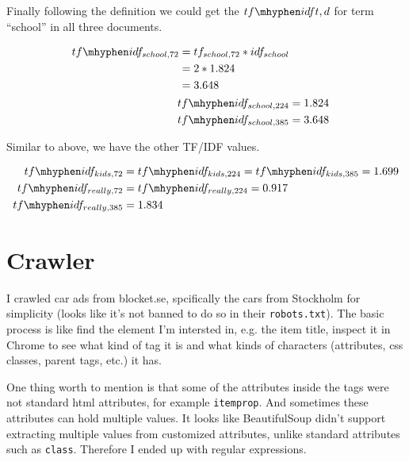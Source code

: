 \documentclass[11pt]{article} %
\begin{document}
Finally following the definition we could get the $tf\mhyphen idf{t, d}$ for term ``school'' in all three documents.

\begin{align*}
    \begin{split}
        tf\mhyphen idf_{school, 72} &= tf_{school, 72} * idf_{school} \\
            &= 2 * 1.824 \\
            &= 3.648
    \end{split}\\
    tf\mhyphen idf_{school, 224} &= 1.824 \\
    tf\mhyphen idf_{school, 385} &= 3.648
\end{align*}

Similar to above, we have the other TF/IDF values.

\begin{align*}
    tf\mhyphen idf_{kids, 72} &= tf\mhyphen idf_{kids, 224} = tf\mhyphen idf_{kids, 385} = 1.699 \\
    tf\mhyphen idf_{really, 72} &= tf\mhyphen idf_{really, 224} = 0.917 \\
    tf\mhyphen idf_{really, 385} &= 1.834
\end{align*}

\section{Crawler}

I crawled car ads from blocket.se, spcifically the cars from Stockholm for simplicity (looks like it's not banned to do so in their \verb|robots.txt|). The basic process is like find the element I'm intersted in, e.g. the item title, inspect it in Chrome to see what kind of tag it is and what kinds of characters (attributes, css classes, parent tags, etc.) it has.

One thing worth to mention is that some of the attributes inside the tags were not standard html attributes, for example \verb|itemprop|. And sometimes these attributes can hold multiple values. It looks like BeautifulSoup didn't support extracting multiple values from customized attributes, unlike standard attributes such as \verb|class|. Therefore I ended up with regular expressions.
\end{document}
